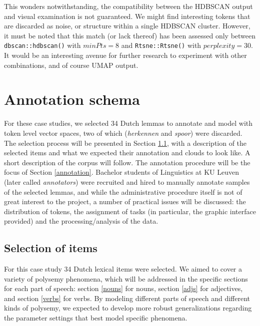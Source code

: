\documentclass[
]{book}
\begin{document}
This wonders notwithstanding, the compatibility between the HDBSCAN output and visual examination is not guaranteed. We might find interesting tokens that are discarded as noise, or structure within
a single HDBSCAN cluster. However, it must be noted that this match (or lack thereof)
has been assessed only between \texttt{dbscan::hdbscan()} with \(minPts = 8\) and
\texttt{Rtsne::Rtsne()} with \(perplexity = 30\). It would be an interesting avenue for further research to experiment with other combinations, and of course UMAP output.

\hypertarget{annotation-schema}{%
\chapter{Annotation schema}\label{annotation-schema}}

For these case studies, we selected 34 Dutch lemmas to annotate and model with token level vector spaces, two of which (\emph{herkennen} and \emph{spoor}) were discarded.
The selection process will be presented in Section \ref{selection}, with a description of the selected items and what we expected their annotation and clouds to look like. A short description of the corpus \autocite[QLVLNewsCorpus,][]{depascale_2019} will follow. The annotation procedure will be the focus of Section \ref{annotation}.
Bachelor students of Linguistics at KU Leuven (later called \emph{annotators}) were recruited and hired to manually annotate samples of the selected lemmas, and while the administrative procedure itself is not of great interest to the project, a number of practical issues will be discussed: the distribution of tokens, the assignment of tasks (in particular, the graphic interface provided) and the processing/analysis of the data.

\hypertarget{selection}{%
\section{Selection of items}\label{selection}}

For this case study 34 Dutch lexical items were selected. We aimed to cover a variety of polysemy phenomena, which will be addressed in the specific sections for each part of speech: section \ref{nouns} for nouns, section \ref{adjs} for adjectives, and section \ref{verbs} for verbs.
By modeling different parts of speech and different kinds of polysemy, we expected to develop more robust generalizations regarding the parameter settings that best model specific phenomena.
\end{document}
